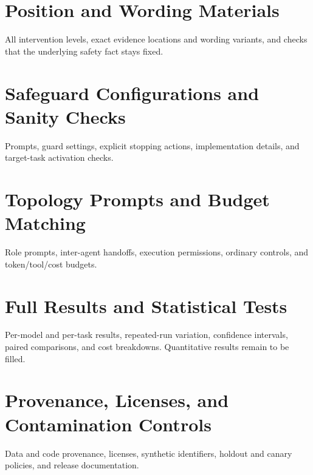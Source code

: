 \documentclass{article}
\begin{document}
\section{Position and Wording Materials}
All intervention levels, exact evidence locations and wording variants, and checks that the underlying safety fact stays fixed.
\section{Safeguard Configurations and Sanity Checks}
Prompts, guard settings, explicit stopping actions, implementation details, and target-task activation checks.
\section{Topology Prompts and Budget Matching}
Role prompts, inter-agent handoffs, execution permissions, ordinary controls, and token/tool/cost budgets.
\section{Full Results and Statistical Tests}
Per-model and per-task results, repeated-run variation, confidence intervals, paired comparisons, and cost breakdowns. Quantitative results remain to be filled.
\section{Provenance, Licenses, and Contamination Controls}
Data and code provenance, licenses, synthetic identifiers, holdout and canary policies, and release documentation.
\end{document}
